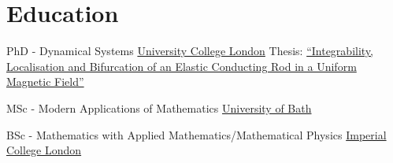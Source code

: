 \documentclass[english, print]{cv-style-wide}
\begin{document}
\section{Education}%
\vspace{-0.2cm}
\begin{entrylist}
%
{PhD \hspace{\diffpwidth/2}-\hspace{\diffpwidth/2} Dynamical Systems}%
{
\href{https://ucl.ac.uk}{University College London}
}%
{%
Thesis: \hspace{\uclwidth}\href{https://www.google.com/url?sa=t&source=web&rct=j&opi=89978449&url=https://discovery.ucl.ac.uk/15832/1/15832.pdf}{\enquote{Integrability, Localisation and Bifurcation of an Elastic Conducting Rod in a Uniform Magnetic Field}} %
}%

%
{MSc - Modern Applications of Mathematics}%
{%
\href{https://bath.ac.uk}{University of Bath}%
}%
{}%

%
{BSc \hspace{\diffbwidth/2}-\hspace{\diffbwidth/2} Mathematics with Applied Mathematics/Mathematical Physics}%
{%
\href{https://imperial.ac.uk}{Imperial College London}%
}%
{}%

\end{entrylist}



\end{document}
